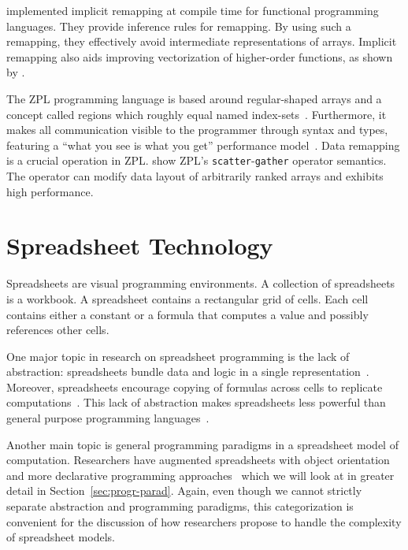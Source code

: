 \documentclass[a4paper]{article}
\begin{document}
\citet{Walinsky:1990:FPL:91556.91610} implemented implicit remapping at compile time for functional programming languages. They provide inference rules for remapping. By using such a remapping, they effectively avoid intermediate representations of arrays. Implicit remapping also aids improving vectorization of higher-order functions, as shown by \citet{Sinkarovs:2013:SDL:2502323.2502332}.

The ZPL programming language is based around regular-shaped arrays and a concept called regions which roughly equal named index-sets~\cite{Chamberlain1999Regions}. Furthermore, it makes all communication visible to the programmer through syntax and types, featuring a ``what you see is what you get'' performance model~\cite{Chamberlain1998ZPLs}. Data remapping is a crucial operation in ZPL.\@ \citet{Deitz:2003:DIP:781498.781526} show ZPL's \texttt{scatter}-\texttt{gather} operator semantics. The operator can modify data layout of arbitrarily ranked arrays and exhibits high performance.

\section{Spreadsheet Technology}
\label{sec:spreadsheet-end-user-dev}

Spreadsheets are visual programming environments. A collection of spreadsheets is a workbook. A spreadsheet contains a rectangular grid of cells. Each cell contains either a constant or a formula that computes a value and possibly references other cells.

One major topic in research on spreadsheet programming is the lack of abstraction: spreadsheets bundle data and logic in a single representation~\cite{Isakowitz:1995:TLT:195705.195708}. Moreover, spreadsheets encourage copying of formulas across cells to replicate computations~\cite{1173080, Benfield:2009:FFD:1668113.1668121}. This lack of abstraction makes spreadsheets less powerful than general purpose programming languages~\cite{Miller:2015:SPB:2814189.2814201}.

Another main topic is general programming paradigms in a spreadsheet model of computation. Researchers have augmented spreadsheets with object orientation~\cite{Benfield:2009:FFD:1668113.1668121} and more declarative programming approaches~\cite{Stadelmann:1993:SBC:168642.168664, Singh:2016:TSD:2837614.2837668} which we will look at in greater detail in Section~\ref{sec:progr-parad}. Again, even though we cannot strictly separate abstraction and programming paradigms, this categorization is convenient for the discussion of how researchers propose to handle the complexity of spreadsheet models.
\end{document}

